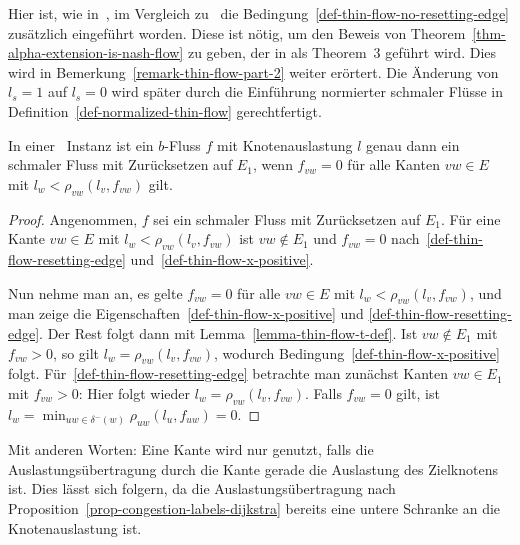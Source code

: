 \begin{remark}\label{remark-thin-flow}
	Hier ist, wie in~\cite[Definition~4]{Cominetti2011}, im Vergleich zu~\cite[Definition~6]{Koch2011} die Bedingung~\ref{def-thin-flow-no-resetting-edge} zusätzlich eingeführt worden.
	Diese ist nötig, um den Beweis von Theorem~\ref{thm-alpha-extension-is-nash-flow} zu geben, der in \cite{Koch2011} als Theorem~3 geführt wird.
	Dies wird in Bemerkung~\ref{remark-thin-flow-part-2} weiter erörtert.
	Die Änderung von $l_s=1$ auf $l_s=0$ wird später durch die Einführung normierter schmaler Flüsse in Definition~\ref{def-normalized-thin-flow} gerechtfertigt.
\end{remark}

\begin{lemma}\label{lemma-equivalent-thin-flow}
	In einer \problemThinFlow\ Instanz ist ein $b$-Fluss $f$ mit Knotenauslastung $l$ genau dann ein schmaler Fluss mit Zurück\-setzen auf $E_1$, wenn $f_{vw}= 0$ für alle Kanten $vw\in E$ mit $l_w < \rho_{vw}(l_v, f_{vw})$ gilt.
\end{lemma}
\begin{proof}
	Angenommen, $f$ sei ein schmaler Fluss mit Zurücksetzen auf $E_1$.
	Für eine Kante $vw\in E$ mit $l_w < \rho_{vw}(l_v, f_{vw})$ ist $vw\notin E_1$ und $f_{vw}=0$ nach~\ref{def-thin-flow-resetting-edge} und~\ref{def-thin-flow-x-positive}.

	Nun nehme man an, es gelte $f_{vw}=0$ für alle $vw\in E$ mit $l_w < \rho_{vw}(l_v, f_{vw})$, und man zeige die Eigenschaften~\ref{def-thin-flow-x-positive} und \ref{def-thin-flow-resetting-edge}.
	Der Rest folgt dann mit Lemma~\ref{lemma-thin-flow-t-def}.
	Ist $vw\notin E_1$ mit $f_{vw}>0$, so gilt $l_w = \rho_{vw}(l_v, f_{vw})$, wodurch Bedingung~\ref{def-thin-flow-x-positive} folgt.
	Für~\ref{def-thin-flow-resetting-edge} betrachte man zunächst Kanten $vw\in E_1$ mit $f_{vw}>0$:
	Hier folgt wieder $l_w = \rho_{vw}(l_v, f_{vw})$.
	Falls $f_{vw}=0$ gilt, ist $l_w=\min_{uw\in \delta^-(w)} \rho_{uw}(l_u, f_{uw}) = 0$.
\end{proof}

Mit anderen Worten: Eine Kante wird nur genutzt, falls die Auslastungs\-über\-tra\-gung durch die Kante gerade die Auslastung des Zielknotens ist.
Dies lässt sich folgern, da die Auslastungsübertragung nach Proposition~\ref{prop-congestion-labels-dijkstra} bereits eine untere Schranke an die Knotenauslastung ist.

